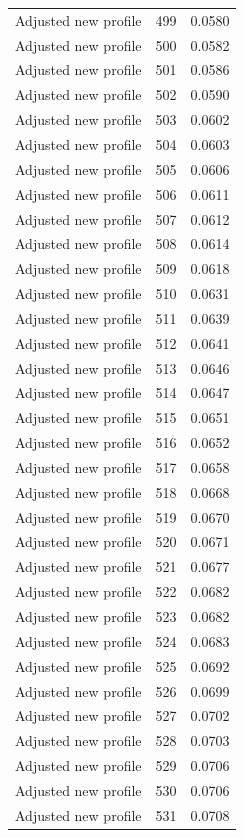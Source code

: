 \begin{table}[htbp]
\begin{tabular}{lll}
Adjusted new profile & 499 & 0.0580 \\
Adjusted new profile & 500 & 0.0582 \\
Adjusted new profile & 501 & 0.0586 \\
Adjusted new profile & 502 & 0.0590 \\
Adjusted new profile & 503 & 0.0602 \\
Adjusted new profile & 504 & 0.0603 \\
Adjusted new profile & 505 & 0.0606 \\
Adjusted new profile & 506 & 0.0611 \\
Adjusted new profile & 507 & 0.0612 \\
Adjusted new profile & 508 & 0.0614 \\
Adjusted new profile & 509 & 0.0618 \\
Adjusted new profile & 510 & 0.0631 \\
Adjusted new profile & 511 & 0.0639 \\
Adjusted new profile & 512 & 0.0641 \\
Adjusted new profile & 513 & 0.0646 \\
Adjusted new profile & 514 & 0.0647 \\
Adjusted new profile & 515 & 0.0651 \\
Adjusted new profile & 516 & 0.0652 \\
Adjusted new profile & 517 & 0.0658 \\
Adjusted new profile & 518 & 0.0668 \\
Adjusted new profile & 519 & 0.0670 \\
Adjusted new profile & 520 & 0.0671 \\
Adjusted new profile & 521 & 0.0677 \\
Adjusted new profile & 522 & 0.0682 \\
Adjusted new profile & 523 & 0.0682 \\
Adjusted new profile & 524 & 0.0683 \\
Adjusted new profile & 525 & 0.0692 \\
Adjusted new profile & 526 & 0.0699 \\
Adjusted new profile & 527 & 0.0702 \\
Adjusted new profile & 528 & 0.0703 \\
Adjusted new profile & 529 & 0.0706 \\
Adjusted new profile & 530 & 0.0706 \\
Adjusted new profile & 531 & 0.0708 \\

\end{tabular}
\end{table}
